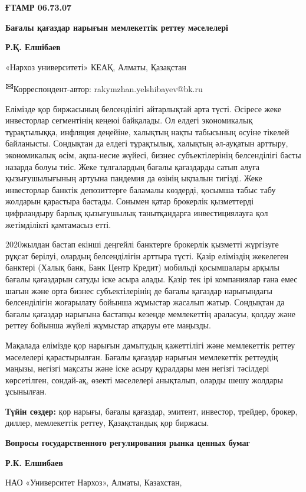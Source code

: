 
\newpage
{\bfseries ҒТАМР 06.73.07}

{\bfseries Бағалы қағаздар нарығын мемлекеттік реттеу мәселелері}

{\bfseries Р.Қ. Елшібаев}

«Нархоз университеті» КЕАҚ, Алматы, Қазақстан

{\bfseries \textsuperscript{🖂}}Корреспондент-автор:
rakymzhan.yelshibayev@bk.ru

Елімізде қор биржасының белсенділігі айтарлықтай арта түсті. Әсіресе
жеке инвесторлар сегментінің кеңеюі байқалады. Ол елдегі экономикалық
тұрақтылыққа, инфляция деңейіне, халықтың нақты табысының өсуіне тікелей
байланысты. Сондықтан да елдегі тұрақтылық, халықтың әл-ауқатын арттыру,
экономикалық өсім, ақша-несие жүйесі, бизнес субъектілерінің
белсенділігі басты назарда болуы тиіс. Жеке тұлғалардың бағалы
қағаздарды сатып алуға қызығушылығының артуына пандемия да өзінің
ықпалын тигізді. Жеке инвесторлар банктік депозиттерге баламалы
көздерді, қосымша табыс табу жолдарын қарастыра бастады. Сонымен қатар
брокерлік қызметтерді цифрландыру барлық қызығушылық танытқандарға
инвестициялауға қол жетімділікті қамтамасыз етті.

2020жылдан бастап екінші деңгейлі банктерге брокерлік қызметті жүргізуге
рұқсат берілуі, олардың белсенділігін арттыра түсті. Қазір еліміздің
жекелеген банктері (Халық банк, Банк Центр Кредит) мобильді қосымшалары
арқылы бағалы қағаздарын сатуды іске асыра алады. Қазір тек ірі
компаниялар ғана емес шағын және орта бизнес субъектілерінің де бағалы
қағаздар нарығындағы белсенділігін жоғарылату бойынша жұмыстар жасалып
жатыр. Сондықтан да бағалы қағаздар нарығына бастапқы кезеңде
мемлекеттің араласуы, қолдау және реттеу бойынша жүйелі жұмыстар атқаруы
өте маңызды.

Мақалада елімізде қор нарығын дамытудың қажеттілігі және мемлекеттік
реттеу мәселелері қарастырылған. Бағалы қағаздар нарығын мемлекеттік
реттеудің маңызы, негізгі мақсаты және іске асыру құралдары мен негізгі
тәсілдері көрсетілген, сондай-ақ, өзекті мәселелері анықталып, оларды
шешу жолдары ұсынылған.

{\bfseries Түйін сөздер:} қор нарығы, бағалы қағаздар, эмитент, инвестор,
трейдер, брокер, диллер, мемлекеттік реттеу, Қазақстандық қор биржасы.

{\bfseries Вопросы государственного регулирования рынка ценных бумаг}

{\bfseries Р.К. Елшибаев}

НАО «Университет Нархоз», Алматы, Казахстан,

